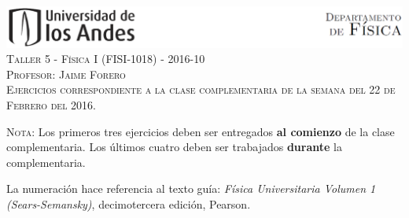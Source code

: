 \documentclass[letterpaper,10pt,onecolumn]{article}
\begin{document}
\begin{center}


\includegraphics[width=490pt]{header.png}\\[0.5cm]

\textsc{\LARGE Taller 5 - F\'isica I (FISI-1018) - 2016-10}\\[0.5cm]

\textsc{\Large{Profesor: Jaime Forero}} \\[0.5cm]

\noindent\textsc{Ejercicios correspondiente a la clase complementaria de la semana del 22 de Febrero del 2016.}\\[0.5cm]
\end{center}

\noindent\textsc{Nota:} 
Los primeros tres ejercicios deben ser
entregados {\bf al comienzo} de la clase complementaria. Los \'ultimos
cuatro deben ser trabajados {\bf durante} la complementaria. 

La numeraci\'on
hace referencia al texto gu\'ia: \textit{F\'isica Universitaria Volumen
  1 (Sears-Semansky)}, decimotercera edici\'on, Pearson.
\end{document}

